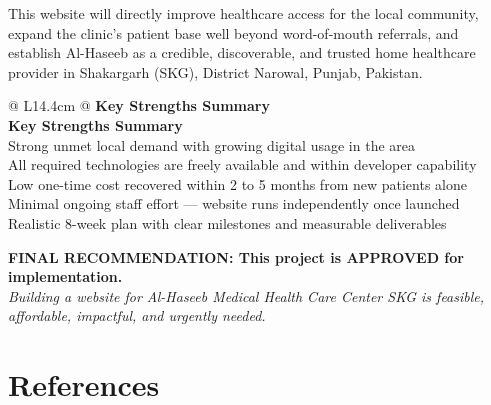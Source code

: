 \documentclass[12pt, a4paper]{article}
\begin{document}
This website will directly improve healthcare access for the local community, expand the clinic's patient base well beyond word-of-mouth referrals, and establish Al-Haseeb as a credible, discoverable, and trusted home healthcare provider in Shakargarh (SKG), District Narowal, Punjab, Pakistan.

\begin{longtable}{@{} L{14.4cm} @{}}
\toprule
\textbf{Key Strengths Summary} \\
\midrule
\endfirsthead
\toprule
\textbf{Key Strengths Summary} \\
\midrule
\endhead
Strong unmet local demand with growing digital usage in the area \\[4pt]
All required technologies are freely available and within developer capability \\[4pt]
Low one-time cost recovered within 2 to 5 months from new patients alone \\[4pt]
Minimal ongoing staff effort — website runs independently once launched \\[4pt]
Realistic 8-week plan with clear milestones and measurable deliverables \\
\bottomrule
\end{longtable}

\begin{center}
\vspace{0.5cm}
\textbf{\large FINAL RECOMMENDATION: This project is APPROVED for implementation.}\\[6pt]
\textit{Building a website for Al-Haseeb Medical Health Care Center SKG is feasible, affordable, impactful, and urgently needed.}
\vspace{0.5cm}
\end{center}

\newpage

\section*{References}
\end{document}
